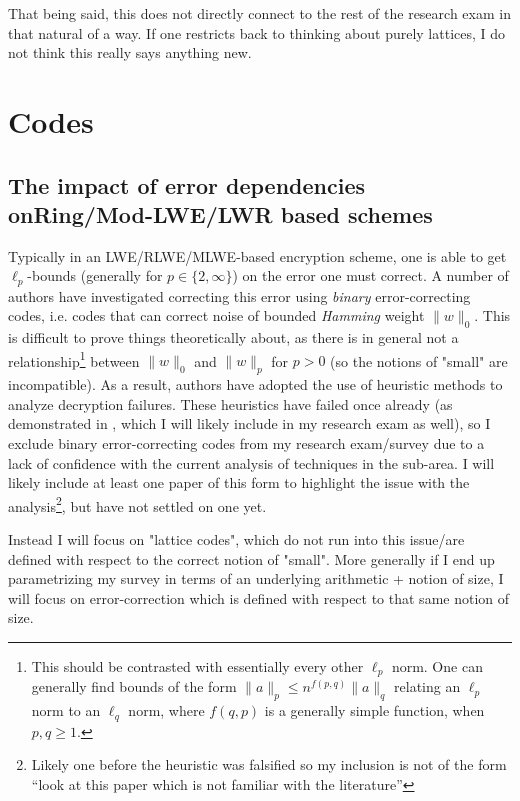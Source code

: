 \documentclass{article}
\begin{document}
	That being said, this does not directly connect to the rest of the research exam in that natural of a way.
	If one restricts back to thinking about purely lattices, I do not think this really says anything new.

\section{Codes}
\subsection{The impact of error dependencies onRing/Mod-LWE/LWR based schemes \cite{ding_impact_2019}}
Typically in an LWE/RLWE/MLWE-based encryption scheme, one is able to get $\ell_p$-bounds (generally for $p\in\{2,\infty\}$) on the error one must correct.
A number of authors have investigated correcting this error using \emph{binary} error-correcting codes, i.e. codes that can correct noise of bounded \emph{Hamming} weight $\lVert w\rVert_0$.
This is difficult to prove things theoretically about, as there is in general not a relationship\footnote{This should be contrasted with essentially every other $\ell_p$ norm. One can generally find bounds of the form $\lVert a\rVert_p \leq n^{f(p, q)}\lVert a\rVert_q$ relating an $\ell_p$ norm to an $\ell_q$ norm, where $f(q, p)$ is a generally simple function, when $p, q\geq 1$.} between $\lVert w\rVert_0$ and $\lVert w\rVert_p$ for $p > 0$ (so the notions of "small" are incompatible).
As a result, authors have adopted the use of heuristic methods to analyze decryption failures.
These heuristics have failed once already (as demonstrated in \cite{ding_impact_2019}, which I will likely include in my research exam as well), so I exclude binary error-correcting codes from my research exam/survey due to a lack of confidence with the current analysis of techniques in the sub-area.
I will likely include at least one paper of this form to highlight the issue with the analysis\footnote{Likely one before the heuristic was falsified so my inclusion is not of the form ``look at this paper which is not familiar with the literature''}, but have not settled on one yet.

Instead I will focus on "lattice codes", which do not run into this issue/are defined with respect to the correct notion of "small".
More generally if I end up parametrizing my survey in terms of an underlying arithmetic + notion of size, I will focus on error-correction which is defined with respect to that same notion of size.
\end{document}
